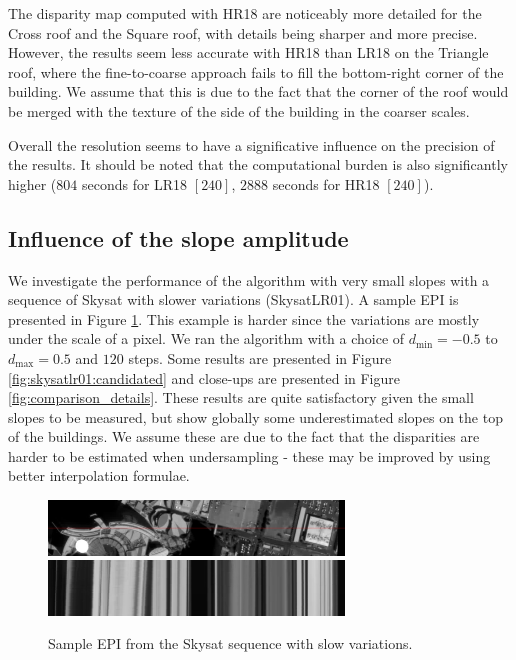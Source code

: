 \documentclass{article}
\def\epiWidth{0.7}
\theoremstyle{definition}
\begin{document}
The disparity map computed with HR18 are noticeably more detailed for the Cross roof and the Square roof, with details being sharper and more precise. However, the results seem less accurate with HR18 than LR18 on the Triangle roof, where the fine-to-coarse approach fails to fill the bottom-right corner of the building. We assume that this is due to the fact that the corner of the roof would be merged with the texture of the side of the building in the coarser scales.


Overall the resolution seems to have a significative influence on the precision of the results. It should be noted that the computational burden is also significantly higher ($804$ seconds for LR18 $[240]$, $2888$ seconds for HR18 $[240]$).


\subsection{Influence of the slope amplitude} 


We investigate the performance of the algorithm with very small slopes with a sequence of Skysat with slower variations (SkysatLR01). A sample EPI is presented in Figure \ref{fig:epi:skysat1}. This example is harder since the variations are mostly under the scale of a pixel. We ran the algorithm with a choice of $d_{\min} = -0.5$ to $d_{\max} = 0.5$ and $120$ steps. Some results are presented in Figure \ref{fig:skysatlr01:candidated} and close-ups are presented in Figure \ref{fig:comparison_details}. These results are quite satisfactory given the small slopes to be measured, but show globally some underestimated slopes on the top of the buildings. We assume these are due to the fact that the disparities are harder to be estimated when undersampling - these may be improved by using better interpolation formulae.


\begin{figure}[ht]
  \centering
  \includegraphics[width=\epiWidth\textwidth]{images/1521592293547_1st.png}\\
  \includegraphics[width=\epiWidth\textwidth]{images/1521592293547_epi.png}
  \caption{Sample EPI from the Skysat sequence with slow variations.}
  \label{fig:epi:skysat1}
\end{figure}
\end{document}
